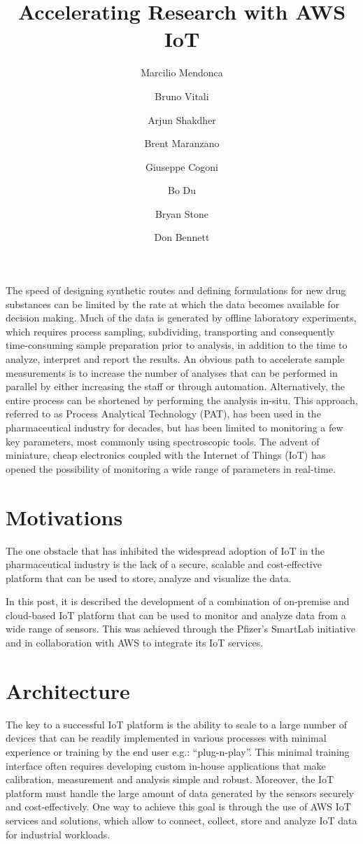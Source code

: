 \documentclass[10pt]{article}
\title{Accelerating Research with AWS IoT}
\author[1]{Marcilio Mendonca}
\author[1]{Bruno Vitali}
\author[1]{Arjun Shakdher}
\author[2]{Brent Maranzano}
\author[2]{Giuseppe Cogoni}
\author[2]{Bo Du}
\author[1]{Bryan Stone}
\author[1]{Don Bennett}
\affil[1]{AWS}
\affil[2]{Pfizer, Inc.}
\date{} %
\begin{document}
\maketitle


\section*{}

The speed of designing synthetic routes and defining 
formulations for new drug substances can be limited by the
rate at which the data becomes available for decision making. 
Much of the data is generated by offline laboratory
experiments, which requires process sampling, subdividing, 
transporting and consequently time-consuming sample 
preparation prior to analysis, in addition to the time
to analyze, interpret and report the results. An obvious
path to accelerate sample measurements is to increase the
number of analyses that can be performed in parallel by
either increasing the staff or through automation.
Alternatively, the entire process can be shortened by performing
the analysis in-situ. This approach, referred to as 
Process Analytical Technology (PAT), has been used in the
pharmaceutical industry for decades, but has been limited
to monitoring a few key parameters, most commonly using spectroscopic tools. 
The advent of miniature, cheap electronics coupled 
with the Internet of Things (IoT) has opened the possibility of 
monitoring a wide range of parameters in real-time.

\section*{Motivations}

The one obstacle that has inhibited the widespread adoption
of IoT in the pharmaceutical industry is the lack of a secure, 
scalable and cost-effective platform that can be used to store, 
analyze and visualize the data. 

In this post, it is described the development of a
combination of on-premise and cloud-based IoT platform
that can be used to monitor and analyze data from a wide
range of sensors. This was achieved through the Pfizer's SmartLab initiative
and in collaboration with AWS to integrate its IoT services.


\section*{Architecture}
The key to a successful IoT platform is the ability to
scale to a large number of devices that can be readily implemented 
in various processes with minimal experience or training
by the end user e.g.: “plug-n-play”. 
This minimal training interface often requires developing custom
in-house applications that make calibration, measurement
and analysis simple and robust. Moreover, the IoT platform 
must handle the large amount of data generated by
the sensors securely and cost-effectively. One way to achieve this 
goal is through the use of AWS IoT services and solutions, which allow to
connect, collect, store and analyze IoT data for industrial workloads.
\end{document}
